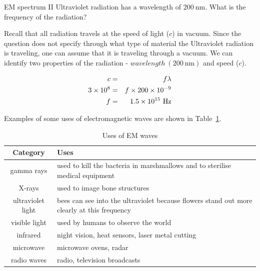 \begin{wex}{EM spectrum II}
{Ultraviolet radiation has a wavelength of $200~\mathrm{nm}$. What is the frequency of the radiation?}
{
Recall that all radiation travels at the speed of light ($c$) in vacuum.
Since the question does not specify through what type of material the Ultraviolet radiation
is traveling, one can assume that it is traveling through a vacuum.
We can identify two properties of the radiation - $wavelength
~(200~\mathrm{nm})$ and speed ($c$).

\begin{eqnarray*}
c &=& f \lambda \\
3 \times 10^{8} &=& f \times 200 \times 10^{-9} \\
f &=&  1.5 \times 10^{15} \ \rm{Hz}
\end{eqnarray*}
}
\end{wex}



Examples of some uses of electromagnetic waves are shown in Table~\ref{tab:emuses}. 

\begin{table}[htbp]
\begin{center}
\caption{Uses of EM waves}
\label{tab:emuses}
\begin{tabular}{|c|p{5cm}|}\hline
\textbf{Category}&\textbf{Uses}\\\hline\hline
gamma rays&used to kill the bacteria in marshmallows and to sterilise medical equipment\\\hline
X-rays&used to image bone structures\\\hline
ultraviolet light&bees can see into the ultraviolet because flowers stand out more clearly at this frequency\\\hline
visible light&used by humans to observe the world\\\hline
infrared&night vision, heat sensors, laser metal cutting\\\hline
microwave&microwave ovens, radar\\\hline
radio waves&radio, television broadcasts\\\hline
\end{tabular}
\end{center}
\end{table}

